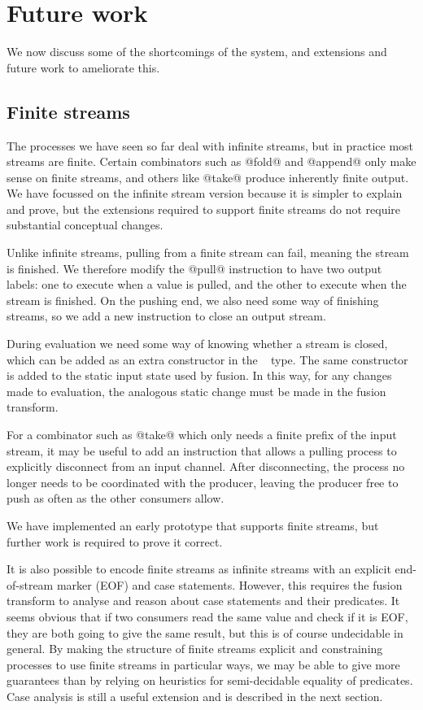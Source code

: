 \section{Future work}
\label{s:FutureWork}

We now discuss some of the shortcomings of the system, and extensions and future work to ameliorate this.

\subsection{Finite streams}
\label{s:Finite}

The processes we have seen so far deal with infinite streams, but in practice most streams are finite.
Certain combinators such as @fold@ and @append@ only make sense on finite streams, and others like @take@ produce inherently finite output.
We have focussed on the infinite stream version because it is simpler to explain and prove, but the extensions required to support finite streams do not require substantial conceptual changes.

Unlike infinite streams, pulling from a finite stream can fail, meaning the stream is finished. We therefore modify the @pull@ instruction to have two output labels: one to execute when a value is pulled, and the other to execute when the stream is finished. On the pushing end, we also need some way of finishing streams, so we add a new instruction to close an output stream.

During evaluation we need some way of knowing whether a stream is closed, which can be added as an extra constructor in the \InputState~ type. The same constructor is added to the static input state used by fusion. In this way, for any changes made to evaluation, the analogous static change must be made in the fusion transform.

For a combinator such as @take@ which only needs a finite prefix of the input stream, it may be useful to add an instruction that allows a pulling process to explicitly disconnect from an input channel.
After disconnecting, the process no longer needs to be coordinated with the producer, leaving the producer free to push as often as the other consumers allow.

We have implemented an early prototype that supports finite streams, but further work is required to prove it correct.

It is also possible to encode finite streams as infinite streams with an explicit end-of-stream marker (EOF) and case statements. However, this requires the fusion transform to analyse and reason about case statements and their predicates. It seems obvious that if two consumers read the same value and check if it is EOF, they are both going to give the same result, but this is of course undecidable in general. By making the structure of finite streams explicit and constraining processes to use finite streams in particular ways, we may be able to give more guarantees than by relying on heuristics for semi-decidable equality of predicates. Case analysis is still a useful extension and is described in the next section.

